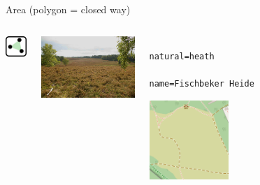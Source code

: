 \documentclass{beamer}
\begin{document}
			\begin{frame}[fragile]{Area (polygon = closed way)}
				\begin{center}
					\begin{columns}
						\begin{column}{1cm}
							\centering
							\includegraphics[width=1cm]{images/240px-Mf_area.png}
						\end{column}
						\begin{column}{4.5cm}
							\includegraphics[width=4.5cm]{images/area-example.jpg}
						\end{column}
						\begin{column}{4cm}
							\begin{verbatim}
								natural=heath
								name=Fischbeker Heide
							\end{verbatim}
							\begin{center}
								\includegraphics[height=3cm]{images/heath.png}
							\end{center}
						\end{column}
					\end{columns}
				\end{center}
			\end{frame}
	
\end{document}
